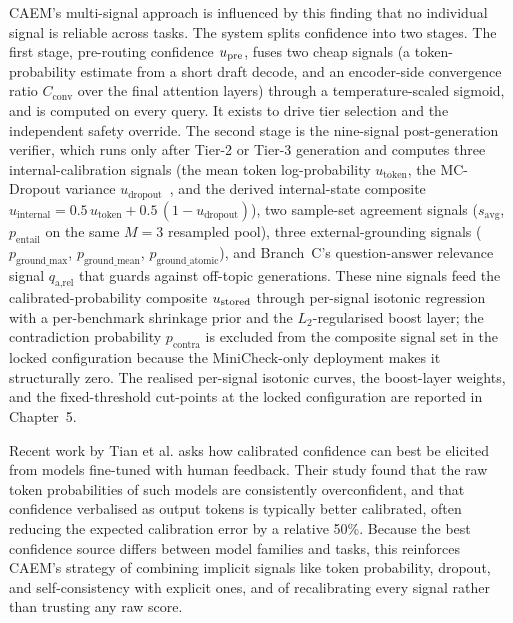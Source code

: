 CAEM's multi-signal approach is influenced by this finding that no individual signal is reliable across tasks. The system splits confidence into two stages. The first stage, pre-routing confidence $u_{\text{pre}}$, fuses two cheap signals (a token-probability estimate from a short draft decode, and an encoder-side convergence ratio $C_{\text{conv}}$ over the final attention layers) through a temperature-scaled sigmoid, and is computed on every query. It exists to drive tier selection and the independent safety override. The second stage is the nine-signal post-generation verifier, which runs only after Tier-2 or Tier-3 generation and computes three internal-calibration signals (the mean token log-probability $u_{\text{token}}$, the MC-Dropout variance $u_{\text{dropout}}$~\cite{pmlr-v48-gal16}, and the derived internal-state composite $u_{\text{internal}} = 0.5\,u_{\text{token}} + 0.5\,(1-u_{\text{dropout}})$), two sample-set agreement signals ($s_{\text{avg}}$, $p_{\text{entail}}$ on the same $M{=}3$ resampled pool), three external-grounding signals ($p_{\text{ground\_max}}$, $p_{\text{ground\_mean}}$, $p_{\text{ground\_atomic}}$), and Branch~C's question-answer relevance signal $q_{\text{a,rel}}$ that guards against off-topic generations. These nine signals feed the calibrated-probability composite $u_{\text{stored}}$ through per-signal isotonic regression with a per-benchmark shrinkage prior and the $L_{2}$-regularised boost layer; the contradiction probability $p_{\text{contra}}$ is excluded from the composite signal set in the locked configuration because the MiniCheck-only deployment makes it structurally zero. The realised per-signal isotonic curves, the boost-layer weights, and the fixed-threshold cut-points at the locked configuration are reported in Chapter~5.

Recent work by Tian et al. \cite{tian2023just} asks how calibrated confidence can best be elicited from models fine-tuned with human feedback. Their study found that the raw token probabilities of such models are consistently overconfident, and that confidence verbalised as output tokens is typically better calibrated, often reducing the expected calibration error by a relative 50\%. Because the best confidence source differs between model families and tasks, this reinforces CAEM's strategy of combining implicit signals like token probability, dropout, and self-consistency with explicit ones, and of recalibrating every signal rather than trusting any raw score.


